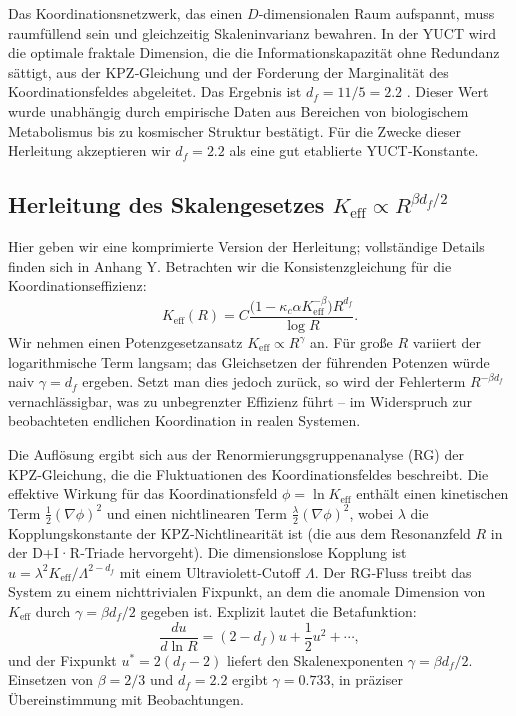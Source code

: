 \documentclass[11pt,a4paper]{article}
\newcommand{\kappac}{\kappa_c}
\newcommand{\Keff}{K_{\mathrm{eff}}}
\newcommand{\betaf}{\beta}
\begin{document}
	Das Koordinationsnetzwerk, das einen \(D\)‑dimensionalen Raum aufspannt, muss raumfüllend sein und gleichzeitig Skaleninvarianz bewahren. In der YUCT wird die optimale fraktale Dimension, die die Informationskapazität ohne Redundanz sättigt, aus der KPZ‑Gleichung und der Forderung der Marginalität des Koordinationsfeldes abgeleitet. Das Ergebnis ist \(d_f = 11/5 = 2.2\) \cite{AppendixL}. Dieser Wert wurde unabhängig durch empirische Daten aus Bereichen von biologischem Metabolismus bis zu kosmischer Struktur bestätigt. Für die Zwecke dieser Herleitung akzeptieren wir \(d_f = 2.2\) als eine gut etablierte YUCT‑Konstante.
	
	\subsection{Herleitung des Skalengesetzes \(\Keff \propto R^{\beta d_f/2}\)}
	
	Hier geben wir eine komprimierte Version der Herleitung; vollständige Details finden sich in Anhang Y. Betrachten wir die Konsistenzgleichung für die Koordinationseffizienz:
	\begin{equation}
		\Keff(R) = C \frac{\bigl(1 - \kappac \alpha \Keff^{-\betaf}\bigr) R^{d_f}}{\log R}.
		\label{eq:consistency}
	\end{equation}
	Wir nehmen einen Potenzgesetzansatz \(\Keff \propto R^{\gamma}\) an. Für große \(R\) variiert der logarithmische Term langsam; das Gleichsetzen der führenden Potenzen würde naiv \(\gamma = d_f\) ergeben. Setzt man dies jedoch zurück, so wird der Fehlerterm \(R^{-\beta d_f}\) vernachlässigbar, was zu unbegrenzter Effizienz führt – im Widerspruch zur beobachteten endlichen Koordination in realen Systemen.
	
	Die Auflösung ergibt sich aus der Renormierungsgruppenanalyse (RG) der KPZ‑Gleichung, die die Fluktuationen des Koordinationsfeldes beschreibt. Die effektive Wirkung für das Koordinationsfeld \(\phi = \ln \Keff\) enthält einen kinetischen Term \(\frac{1}{2}(\nabla \phi)^2\) und einen nichtlinearen Term \(\frac{\lambda}{2}(\nabla \phi)^2\), wobei \(\lambda\) die Kopplungskonstante der KPZ‑Nichtlinearität ist (die aus dem Resonanzfeld \(R\) in der D+I·R‑Triade hervorgeht). Die dimensionslose Kopplung ist \(u = \lambda^2 \Keff / \Lambda^{2-d_f}\) mit einem Ultraviolett‑Cutoff \(\Lambda\). Der RG‑Fluss treibt das System zu einem nichttrivialen Fixpunkt, an dem die anomale Dimension von \(\Keff\) durch \(\gamma = \beta d_f / 2\) gegeben ist. Explizit lautet die Betafunktion:
	\[
	\frac{du}{d\ln R} = (2 - d_f) u + \frac{1}{2} u^2 + \cdots,
	\]
	und der Fixpunkt \(u^* = 2(d_f - 2)\) liefert den Skalenexponenten \(\gamma = \beta d_f / 2\). Einsetzen von \(\beta = 2/3\) und \(d_f = 2.2\) ergibt \(\gamma = 0.733\), in präziser Übereinstimmung mit Beobachtungen.
	
\end{document}
